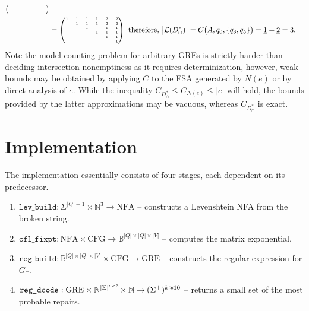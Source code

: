 \documentclass[sigplan,review,acmsmall,nonacm,screen,anonymous]{acmart}\settopmatter{printfolios=false,printccs=false,printacmref=false}
\begin{document}
\begin{align}
\begin{tiny}
\begin{pmatrix}
              &   &   &   &   &   \\
              &   &   &   &   &   \\
  \end{pmatrix}\end{tiny}\\
  &= \begin{tiny}\begin{pmatrix}
          1   & 1  & 1  & \underline{1} & 2 & \underline{2} \\
              & 1  & 1  & 1 & 2 & 2 \\
              &    & 1  &   & 1 & 1 \\
              &    &    & 1 & 1 & 1 \\
              &    &    &   & 1 & 1 \\
              &    &    &   &   & 1 \\
\end{pmatrix}\end{tiny} \text{ therefore, } \big|\mathcal{L}(D_\cap^*)\big| = C\big(A, q_0, \{q_3, q_5\}\big) = \underline{1} + \underline{2} = 3.
\end{align}
Note the model counting problem for arbitrary GREs is strictly harder than deciding intersection nonemptiness as it requires determinization, however, weak bounds may be obtained by applying $C$ to the FSA generated by $N(e)$ or by direct analysis of $e$. While the inequality $C_{D_\cap^*} \leq C_{N(e)} \leq |e|$ will hold, the bounds provided by the latter approximations may be vacuous, whereas $C_{D_\cap^*}$ is exact.

\clearpage\section{Implementation}\label{sec:implementation}

The implementation essentially consists of four stages, each dependent on its predecessor.

\begin{enumerate}
  \item $\texttt{lev\_build}: \Sigma^{|Q|-1} \times \mathbb{N}^{3} \rightarrow \text{NFA}$ -- constructs a Levenshtein NFA from the broken string.
  \item $\texttt{cfl\_fixpt}: \text{NFA} \times \text{CFG} \rightarrow \mathbb{B}^{|Q|\times |Q| \times |V|}$ -- computes the matrix exponential.
  \item $\texttt{reg\_build}: \mathbb{B}^{|Q|\times |Q| \times |V|} \times \text{CFG} \rightarrow \text{GRE}$ -- constructs the regular expression for $G_\cap$.
  \item $\texttt{reg\_dcode}: \text{GRE} \times \mathbb{N}^{|\Sigma|^{c\approx 3}} \hspace{-0.05cm}\times \mathbb{N} \rightarrow\hspace{-0.02cm} (\Sigma^+)^{k\approx 10}$ -- returns a small set of the most probable repairs.
\end{enumerate}
\end{document}
